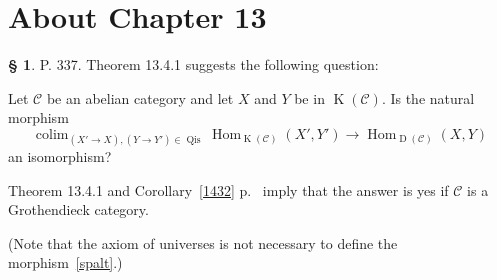 \documentclass[12pt]{article}
\theoremstyle{remark}
\theoremstyle{definition}
\newtheorem{s}[thm]{\S}
\newcommand{\bb}{\mathbb}
\newcommand{\oo}{\operatorname}
\newcommand{\C}{\mathcal C}
\DeclareMathOperator*{\coli}{colim}
\DeclareMathOperator*{\co}{colim}
\DeclareMathOperator*{\ic}{``\coli"}
\DeclareMathOperator{\Hom}{Hom}%
\DeclareMathOperator{\Mod}{Mod}
\DeclareMathOperator{\op}{op}
\begin{document}
\section{About Chapter 13}
%
%
\begin{comment}
%
\begin{s} 
P. 337. I would state Theorem 13.4.1 as follows:

Let $\C$ be an abelian category. Assume that the functor 
$$
\Hom_\C^\bullet:\oo K(\C)\times\oo K(\C)^{\op}\to\oo D(\Mod(\bb Z))
$$ 
given by $(X',Y')\mapsto\oo{tot}_\pi\Hom_\C^{\bullet,\bullet}(X',Y')$ (see \S\ 11.7) is universally right localizable, and denote its right localization by $\oo{RHom}_\C$. Then we have for $X,Y\in\oo D(\C)$\bigskip 

\noindent$(13.4.1)\hskip6em H^0\oo{RHom}_\C(X,Y)\simeq\Hom_{\oo D(\C)}(X,Y).$\bigskip

Here is variant (slightly stronger and closer to the original):

Let $\C$ be an abelian category, let $X,Y\in\oo D(\C)$. Assume that the inductive limit 
$$
\oo{RHom}_\C(X,Y):=\ic_{(X'\to X),(Y\to Y')\in\oo{Qis}}\oo{tot}_\pi\Hom_\C^{\bullet,\bullet}(X',Y')
$$ 
(see \S\ 11.7) exists in $\oo D(\Mod(\bb Z))$. Then\bigskip 

\noindent$(13.4.1)\hskip6em H^0\oo{RHom}_\C(X,Y)\simeq\Hom_{D(\C)}(X,Y).$
\end{s}
%
\end{comment}
%
%
\begin{s}\label{q337}
P. 337. Theorem 13.4.1 suggests the following question: 

Let $\C$ be an abelian category and let $X$ and $Y$ be in $\oo K(\C)$. Is the natural morphism 
%
\begin{equation}\label{spalt}
\co_{(X'\to X),(Y\to Y')\in\oo{Qis}}\Hom_{\oo K(\C)}(X',Y')\to\Hom_{\oo D(\C)}(X,Y)
\end{equation}
%
an isomorphism?

Theorem 13.4.1 and Corollary~\ref{1432} p.~\pageref{1432} %
imply that the answer is yes if $\C$ is a Grothendieck category. 

(Note that the axiom of universes is not necessary to define the morphism~\eqref{spalt}.)
\end{s}
%
\end{document}
